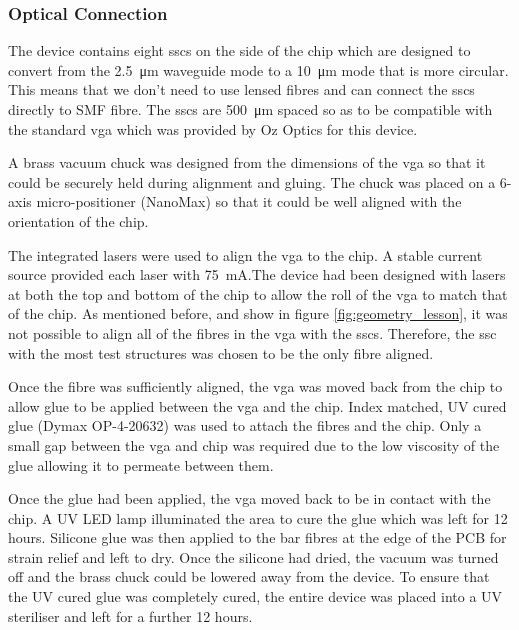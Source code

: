 \subsubsection*{Optical Connection}

The device contains eight \acp{ssc} on the side of the chip which are designed to convert from the \SI{2.5}{\um} waveguide mode to a \SI{10}{\um} mode that is more circular. This means that we don't need to use lensed fibres and can connect the \acp{ssc} directly to SMF fibre. The \acp{ssc} are \SI{500}{\um} spaced so as to be compatible with the standard \acs{vga} which was provided by Oz Optics for this device. 

A brass vacuum chuck was designed from the dimensions of the \ac{vga} so that it could be securely held during alignment and gluing. The chuck was placed on a 6-axis micro-positioner (NanoMax) so that it could be well aligned with the orientation of the chip. 

The integrated lasers were used to align the \ac{vga} to the chip. A stable current source provided each laser with \SI{75}{\mA}.The device had been designed with lasers at both the top and bottom of the chip to allow the roll of the \ac{vga} to match that of the chip. As mentioned before, and show in figure \ref{fig:geometry_lesson}, it was not possible to align all of the fibres in the \ac{vga} with the \acp{ssc}. Therefore, the \ac{ssc} with the most test structures was chosen to be the only fibre aligned. 


Once the fibre was sufficiently aligned, the \ac{vga} was moved back from the chip to allow glue to be applied between the \ac{vga} and the chip. Index matched, UV cured glue (Dymax OP-4-20632) was used to attach the fibres and the chip. Only a small gap between the \ac{vga} and chip was required due to the low viscosity of the glue allowing it to permeate between them. 

Once the glue had been applied, the \ac{vga} moved back to be in contact with the chip. A UV LED lamp illuminated the area to cure the glue which was left for 12 hours. Silicone glue was then applied to the bar fibres at the edge of the PCB for strain relief and left to dry. Once the silicone had dried, the vacuum was turned off and the brass chuck could be lowered away from the device. To ensure that the UV cured glue was completely cured, the entire device was placed into a UV steriliser and left for a further 12 hours. 

